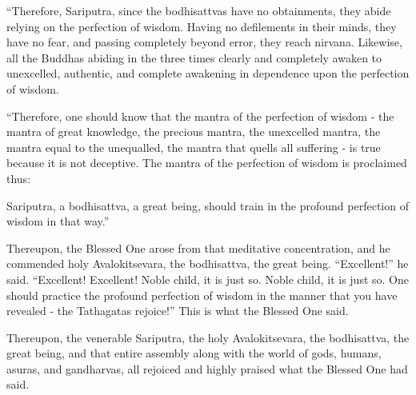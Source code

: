 \documentclass[10pt]{article}
\begin{document}
``Therefore, Sariputra, since the bodhisattvas have no obtainments, they abide relying on the perfection of wisdom. Having no defilements in their minds, they have no fear, and passing completely beyond error, they reach nirvana. Likewise, all the Buddhas abiding in the three times clearly and completely awaken to unexcelled, authentic, and complete awakening in dependence upon the perfection of wisdom.

``Therefore, one should know that the mantra of the perfection of wisdom - the mantra of great knowledge, the precious mantra, the unexcelled mantra, the mantra equal to the unequalled, the mantra that quells all suffering - is true because it is not deceptive. The mantra of the perfection of wisdom is proclaimed thus:

\begin{quote}

\end{quote}

Sariputra, a bodhisattva, a great being, should train in the profound perfection of wisdom in that way.''

Thereupon, the Blessed One arose from that meditative concentration, and he commended holy Avalokitsevara, the bodhisattva, the great being. ``Excellent!'' he said. ``Excellent! Excellent! Noble child, it is just so. Noble child, it is just so. One should practice the profound perfection of wisdom in the manner that you have revealed - the Tathagatas rejoice!'' This is what the Blessed One said.

Thereupon, the venerable Sariputra, the holy Avalokitsevara, the bodhisattva, the great being, and that entire assembly along with the world of gods, humans, asuras, and gandharvas, all rejoiced and highly praised what the Blessed One had said.
\end{document}
